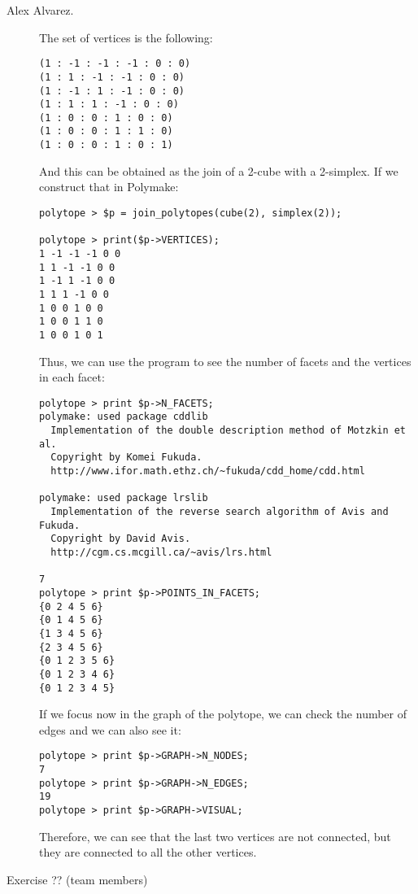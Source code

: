 \begin{description}
\item [Alex Alvarez.] The set of vertices is the following:
\begin{verbatim}
(1 : -1 : -1 : -1 : 0 : 0)
(1 : 1 : -1 : -1 : 0 : 0)
(1 : -1 : 1 : -1 : 0 : 0)
(1 : 1 : 1 : -1 : 0 : 0)
(1 : 0 : 0 : 1 : 0 : 0)
(1 : 0 : 0 : 1 : 1 : 0)
(1 : 0 : 0 : 1 : 0 : 1)
\end{verbatim}
And this can be obtained as the join of a 2-cube with a 2-simplex. If we construct that in Polymake:
\begin{verbatim}
polytope > $p = join_polytopes(cube(2), simplex(2));

polytope > print($p->VERTICES);
1 -1 -1 -1 0 0
1 1 -1 -1 0 0
1 -1 1 -1 0 0
1 1 1 -1 0 0
1 0 0 1 0 0
1 0 0 1 1 0
1 0 0 1 0 1
\end{verbatim}

Thus, we can use the program to see the number of facets and the vertices in each facet:

\begin{verbatim}
polytope > print $p->N_FACETS;
polymake: used package cddlib
  Implementation of the double description method of Motzkin et al.
  Copyright by Komei Fukuda.
  http://www.ifor.math.ethz.ch/~fukuda/cdd_home/cdd.html

polymake: used package lrslib
  Implementation of the reverse search algorithm of Avis and Fukuda.
  Copyright by David Avis.
  http://cgm.cs.mcgill.ca/~avis/lrs.html

7
polytope > print $p->POINTS_IN_FACETS;
{0 2 4 5 6}
{0 1 4 5 6}
{1 3 4 5 6}
{2 3 4 5 6}
{0 1 2 3 5 6}
{0 1 2 3 4 6}
{0 1 2 3 4 5}
\end{verbatim}

If we focus now in the graph of the polytope, we can check the number of edges and we can also see it:
\begin{verbatim}
polytope > print $p->GRAPH->N_NODES;
7
polytope > print $p->GRAPH->N_EDGES;
19
polytope > print $p->GRAPH->VISUAL;
\end{verbatim}

Therefore, we can see that the last two vertices are not connected, but they are connected to all the other vertices.
\item[Exercise ?? (team members)] 
\end{description}



